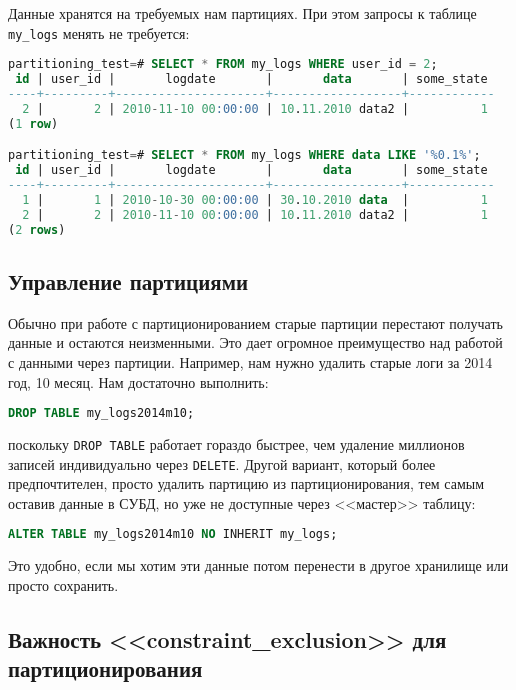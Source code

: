 Данные хранятся на требуемых нам партициях. При этом запросы к таблице \lstinline!my_logs! менять не требуется:

\begin{lstlisting}[language=SQL,label=lst:partitioning11,caption=Проверка запросов]
partitioning_test=# SELECT * FROM my_logs WHERE user_id = 2;
 id | user_id |       logdate       |       data       | some_state
----+---------+---------------------+------------------+------------
  2 |       2 | 2010-11-10 00:00:00 | 10.11.2010 data2 |          1
(1 row)

partitioning_test=# SELECT * FROM my_logs WHERE data LIKE '%0.1%';
 id | user_id |       logdate       |       data       | some_state
----+---------+---------------------+------------------+------------
  1 |       1 | 2010-10-30 00:00:00 | 30.10.2010 data  |          1
  2 |       2 | 2010-11-10 00:00:00 | 10.11.2010 data2 |          1
(2 rows)
\end{lstlisting}


\subsection{Управление партициями}


Обычно при работе с партиционированием старые партиции перестают получать данные и остаются неизменными. Это дает огромное преимущество над работой с данными через партиции. Например, нам нужно удалить старые логи за 2014 год, 10 месяц. Нам достаточно выполнить:

\begin{lstlisting}[language=SQL,label=lst:partitioning12,caption=Чистка логов]
DROP TABLE my_logs2014m10;
\end{lstlisting}

поскольку \lstinline!DROP TABLE! работает гораздо быстрее, чем удаление миллионов записей индивидуально через \lstinline!DELETE!. Другой вариант, который более предпочтителен, просто удалить партицию из партиционирования, тем самым оставив данные в СУБД, но уже не доступные через <<мастер>> таблицу:

\begin{lstlisting}[language=SQL,label=lst:partitioning13,caption=Удаляем партицию из партиционирования]
ALTER TABLE my_logs2014m10 NO INHERIT my_logs;
\end{lstlisting}

Это удобно, если мы хотим эти данные потом перенести в другое хранилище или просто сохранить.


\subsection{Важность <<constraint\_exclusion>> для партиционирования}



